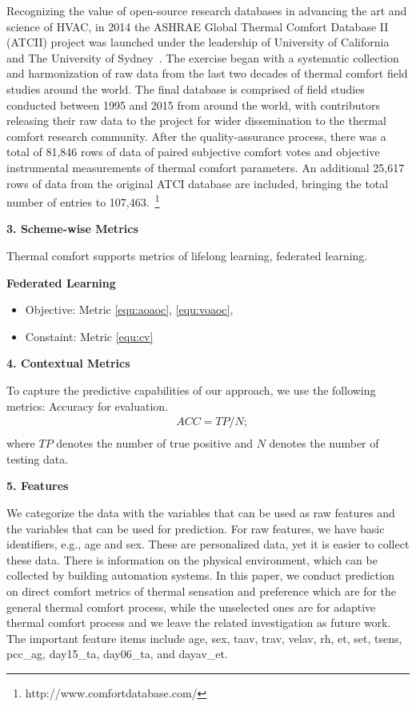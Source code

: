 Recognizing the value of open-source research databases in advancing the art and science of HVAC, in 2014 the ASHRAE Global Thermal Comfort Database II (ATCII) project was launched under the leadership of University of California and The University of Sydney~\cite{licina18}. The exercise began with a systematic collection and harmonization of raw data from the last two decades of thermal comfort field studies around the world. The final database is comprised of field studies conducted between 1995 and 2015 from around the world, with contributors releasing their raw data to the project for wider dissemination to the thermal comfort research community. After the quality-assurance process, there was a total of 81,846 rows of data of paired subjective comfort votes and objective instrumental measurements of thermal comfort parameters. An additional 25,617 rows of data from the original ATCI database are included, bringing the total number of entries to 107,463.~\footnote{http://www.comfortdatabase.com/}

\noindent
\textbf{3. Scheme-wise Metrics}

Thermal comfort supports metrics of lifelong learning, federated learning. 

\noindent \textbf{Federated Learning}
\begin{itemize}
    \item Objective: Metric \ref{equ:aoaoc}, \ref{equ:voaoc}, 
    \item Constaint: Metric \ref{equ:cv}
\end{itemize}



\noindent
\textbf{4. Contextual Metrics} 

To capture the predictive capabilities of our approach, we use the following metrics: Accuracy for evaluation.
\noindent
\begin{equation*}
\begin{split}
&ACC = TP / N; \\
\end{split}
\end{equation*}
where $TP$ denotes the number of true positive and $N$ denotes the number of testing data. 

\noindent
\textbf{5. Features}

We categorize the data with the variables that can be used as raw features and the variables that can be used for prediction. For raw features, we have basic identifiers, e.g., age and sex. These are personalized data, yet it is easier to collect these data. There is information on the physical environment, which can be collected by building automation systems. In this paper, we conduct prediction on direct comfort metrics of thermal sensation and preference which are for the general thermal comfort process, while the unselected ones are for adaptive thermal comfort process and we leave the related investigation as future work. The important feature items include age, sex, taav, trav, velav, rh, et, set, tsens, pcc\_ag, day15\_ta, day06\_ta, and dayav\_et. 

